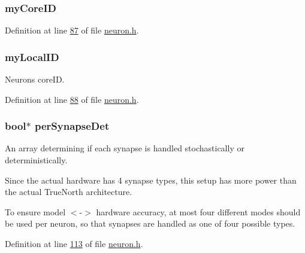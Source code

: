 \subsubsection[{my\+Core\+I\+D}]{ my\+Core\+I\+D}\label{structneuron_state_a76ef99e5766b6e36c3f41a2920e8c56c}


Definition at line \hyperlink{neuron_8h_source_l00087}{87} of file \hyperlink{neuron_8h_source}{neuron.\+h}.

\hypertarget{structneuron_state_ac24762c24aede292a2ce5df78114881c}{}
\subsubsection[{my\+Local\+I\+D}]{ my\+Local\+I\+D}\label{structneuron_state_ac24762c24aede292a2ce5df78114881c}


Neuron\textquotesingle{}s core\+I\+D. 



Definition at line \hyperlink{neuron_8h_source_l00088}{88} of file \hyperlink{neuron_8h_source}{neuron.\+h}.

\hypertarget{structneuron_state_a95688135a244a3ce3b35698a49d0da18}{}
\subsubsection[{per\+Synapse\+Det}]{\setlength{\rightskip}{0pt plus 5cm}bool$\ast$ per\+Synapse\+Det}\label{structneuron_state_a95688135a244a3ce3b35698a49d0da18}


An array determining if each synapse is handled stochastically or deterministically. 

Since the actual hardware has 4 synapse types, this setup has more power than the actual True\+North architecture.

To ensure model $<$-\/$>$ hardware accuracy, at most four different modes should be used per neuron, so that synapses are handled as one of four possible types. 

Definition at line \hyperlink{neuron_8h_source_l00113}{113} of file \hyperlink{neuron_8h_source}{neuron.\+h}.

\hypertarget{structneuron_state_ab39656a1580505adcabc4c7a1f4d8100}{}
